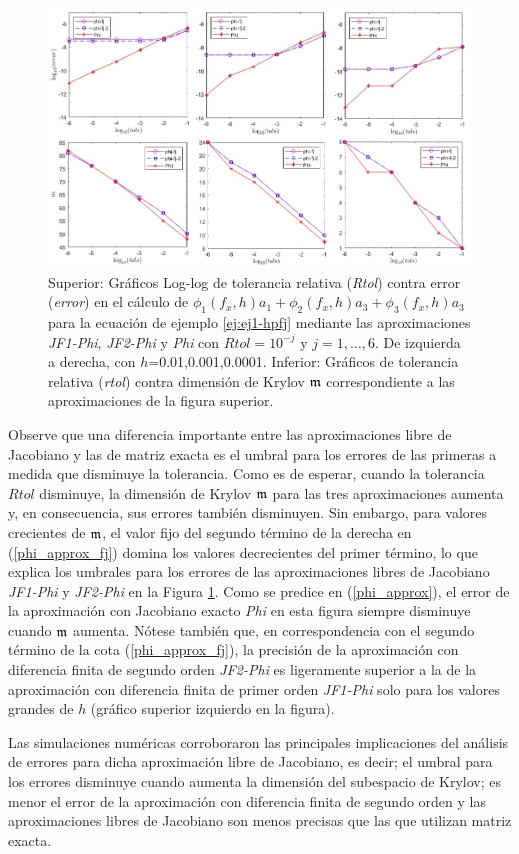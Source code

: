 \begin{figure}[htb]
	\includegraphics[scale=0.57]{Graphics/kpfj-brusselator-em.jpg}
	\caption{Superior: Gráficos Log-log de tolerancia relativa (\textit{Rtol}) contra error (\textit{error}) en el cálculo de $\phi _{1}(f_x,h)a_{1}+\phi _{2}(f_x,h)a_{3}+\phi _{3}(f_x,h)a_{3}$ para la ecuación de ejemplo \ref{ej:ej1-hpfj} mediante las aproximaciones \textit{JF1-Phi}, \textit{JF2-Phi} y \textit{Phi} con $Rtol=10^{-j}$ y $j=1,\ldots,6$. De izquierda a derecha, con $h$=0.01,0.001,0.0001. Inferior: Gráficos de tolerancia relativa (\textit{rtol}) contra dimensión de Krylov $\mathfrak{m}$ correspondiente a las aproximaciones de la figura superior.}
	\label{fig:SumPhiBrusselator}
\end{figure}

Observe que una diferencia importante entre las aproximaciones libre de Jacobiano y las de matriz exacta es el umbral para los errores de las primeras a medida que disminuye la tolerancia. Como es de esperar, cuando la tolerancia $Rtol$ disminuye, la dimensión de Krylov $\mathfrak{m}$ para las tres aproximaciones aumenta y, en consecuencia, sus errores también disminuyen. Sin embargo, para valores crecientes de $\mathfrak{m}$, el valor fijo del segundo término de la derecha en (\ref{phi_approx_fj}) domina los valores decrecientes del primer término, lo que explica los umbrales para los errores de las aproximaciones libres de Jacobiano \textit{JF1-Phi} y \textit{JF2-Phi} en la Figura \ref{fig:SumPhiBrusselator}. Como se predice en (\ref{phi_approx}), el error de la aproximación con Jacobiano exacto \textit{Phi} en esta figura siempre disminuye cuando $\mathfrak{m}$ aumenta. Nótese también que, en correspondencia con el segundo término de la cota (\ref{phi_approx_fj}), la precisión de la aproximación con diferencia finita de segundo orden \textit{JF2-Phi} es ligeramente superior a la de la aproximación con diferencia finita de primer orden \textit{JF1-Phi} solo para los valores grandes de $h$ (gráfico superior izquierdo en la figura).

Las simulaciones numéricas corroboraron las principales implicaciones del análisis de errores para dicha aproximación libre de Jacobiano, es decir; el umbral para los errores disminuye cuando aumenta la dimensión del subespacio de Krylov; es menor el error de la aproximación con diferencia finita de segundo orden y  las aproximaciones libres de Jacobiano son menos precisas que las que utilizan matriz exacta.